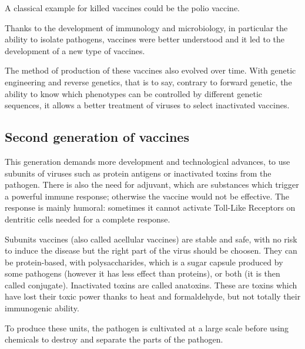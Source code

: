 \documentclass{article}
\begin{document}
            A classical example for killed vaccines could be the polio vaccine.  
                       

            Thanks to the development of immunology and microbiology, in particular the ability to isolate pathogens, vaccines were better understood
                and it led to the development of a new type of vaccines.

            The method of production of these vaccines also evolved over time. With genetic engineering and reverse genetics, that is to say,  
                contrary to forward genetic, the ability to know which phenotypes can be controlled by different genetic sequences,
                it allows a better treatment of viruses to select inactivated vaccines.

        \subsection{Second generation of vaccines}


            This generation demands more development and technological advances,
                to use subunits of viruses such as protein antigens or inactivated toxins from the pathogen. %
            There is also the need for adjuvant, which are substances which trigger a powerful immune response; otherwise the vaccine would not be effective. 
            The response is mainly humoral: sometimes it cannot activate Toll-Like Receptors on dentritic cells needed for a complete response.

            Subunits vaccines (also called acellular vaccines) are stable and safe, with no risk to induce the disease but the right part of the virus should be choosen.
                They can be protein-based, with polysaccharides, which is a sugar capsule produced by some pathogens (however it has less effect than proteins), or both (it is then called conjugate).
            Inactivated toxins are called anatoxins. These are toxins which have lost their toxic power thanks to heat and formaldehyde, but not totally their immunogenic ability.

            To produce these units, the pathogen is cultivated at a large scale before using chemicals to destroy and separate the parts of the pathogen.
\end{document}
